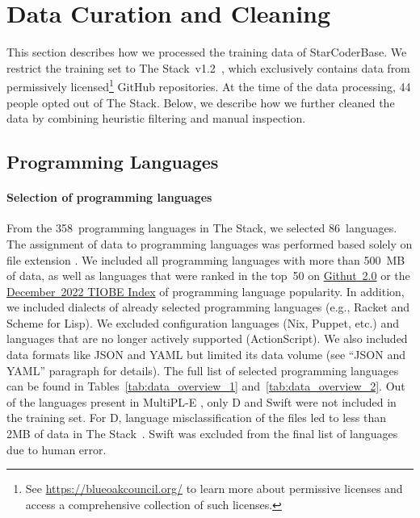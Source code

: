 \section{Data Curation and Cleaning}\label{sec:data_curation}
This section describes how we processed the training data of StarCoderBase. We restrict the training set to The Stack~v1.2~\citep{Kocetkov2022TheStack}, which exclusively contains data from permissively licensed\footnote{See \url{https://blueoakcouncil.org/} to learn more about permissive licenses and access a comprehensive collection of such licenses. } GitHub repositories. At the time of the data processing, 44 people opted out of The Stack. Below, we describe how we further cleaned the data by combining heuristic filtering and manual inspection.  

\subsection{Programming Languages} \label{subsec:pls}
\paragraph{Selection of programming languages} From the 358~programming languages in The Stack, we selected 86~languages. The assignment of data to programming languages was performed based solely on file extension \citep{Kocetkov2022TheStack}. We included all programming languages with more than 500~MB of data, as well as languages that were ranked in the top~50 on \href{https://githut.info}{Githut~2.0} or the \href{https://web.archive.org/web/20221229040526/https://www.tiobe.com/tiobe-index/}{December~2022 TIOBE Index} of programming language popularity. In addition, we included dialects of already selected programming languages (e.g., Racket and Scheme for Lisp). We excluded configuration languages (Nix, Puppet, etc.) and languages that are no longer actively supported (ActionScript). We also included data formats like JSON and YAML but limited its data volume (see ``JSON and YAML'' paragraph for details). The full list of selected programming languages can be found in Tables~\ref{tab:data_overview_1} and~\ref{tab:data_overview_2}. 
Out of the languages present in MultiPL-E \citep{cassano2022multiple}, only D and Swift were not included in the training set. For D, language misclassification of the files led to less than 2MB of data in The Stack~\citep{Kocetkov2022TheStack}. Swift was excluded from the final list of languages due to human error.

